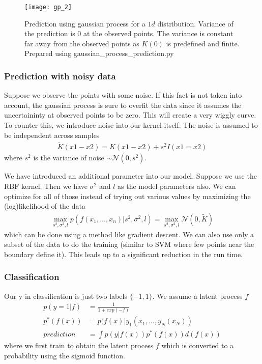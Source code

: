 \documentclass[../../statistical_learning_notes.tex]{subfiles}
\begin{document}
\begin{figure}[h]
\texttt{[image: gp\_2]}
\centering
\caption{Prediction using gaussian process for a $1d$ distribution. Variance of the prediction is $0$ at the observed points. The variance is constant far away from the observed points as $K(0)$ is predefined and finite. Prepared using gaussian\_process\_prediction.py}
\label{fig:gp_2} %
\end{figure}


\subsubsection*{Prediction with noisy data}
Suppose we observe the points with some noise. If this fact is not taken into account, the gaussian process is sure to overfit the data since it assumes the uncertaininty at observed points to be zero. This will create a very wiggly curve. To counter this, we introduce noise into our kernel itself. The noise is assumed to be independent across samples
\begin{align*}
    \tilde{K}(x1- x2) = K(x1 - x2) + s^{2}I(x1 = x2)
\end{align*}
where $s^{2}$ is the variance of noise $\sim \mathcal{N}(0, s^{2})$.\newline

We have introduced an additional parameter into our model. Suppose we use the RBF kernel. Then we have $\sigma^{2}$ and $l$ as the model parameters also. We can optimize for all of those instead of trying out various values by maximizing the (log)likelihood of the data
\begin{align*}
    \max_{s^{2}, \sigma^{2}, l} p(f(x_{1}, \ldots, x_{n})|s^{2}, \sigma^{2}, l)
    = \max_{s^{2}, \sigma^{2}, l} \mathcal{N}(0, \tilde{K})
\end{align*}
which can be done using a method like gradient descent. We can also use only a subset of the data to do the training (similar to SVM where few points near the boundary define it). This leads up to a significant reduction in the run time.


\subsubsection*{Classification}
Our y in classification is just two labels $\{-1,1 \}$. We assume a latent process $f$
\begin{align*}
    p(y=1|f) &= \frac{1}{1 + exp(-f)}\\
    p^{*}(f(x)) &= p(f(x) | y_{1}(x_{1}, \ldots, y_{N}(x_{N}))\\
    prediction &= \int p(y|f(x))p^{*}(f(x)) d(f(x))
\end{align*}
where we first train to obtain the latent process $f$ which is converted to a probability using the sigmoid function.
\end{document}
